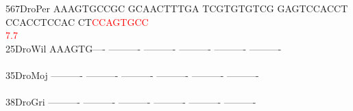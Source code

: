 \documentclass[11pt,twoside,reqno,a4paper]{article}
\begin{document}
{567\hspace*{2\charwidth}DroPer	AAAGTGCCGC	GCAACTTTGA	TCGTGTGTCG	GAGTCCACCT	CCACCTCCAC	CT\textcolor{red}{C}\textcolor{red}{C}\textcolor{red}{A}\textcolor{red}{G}\textcolor{red}{T}\textcolor{red}{G}\textcolor{red}{C}\textcolor{red}{C}	\\
\hspace*{5\charwidth}\hspace*{7\charwidth}\hspace*{1\charwidth}\hspace*{1\charwidth}\hspace*{1\charwidth}\hspace*{1\charwidth}\hspace*{1\charwidth}\hspace*{52\charwidth}\textcolor{red}{7.7}\hspace*{1\charwidth}\\
25\hspace*{3\charwidth}DroWil	AAAGTG----	----------	----------	----------	----------	----------	\\
\hspace*{5\charwidth}\hspace*{7\charwidth}\hspace*{1\charwidth}\hspace*{1\charwidth}\hspace*{1\charwidth}\hspace*{1\charwidth}\hspace*{1\charwidth}\hspace*{1\charwidth}\\
35\hspace*{3\charwidth}DroMoj	----------	----------	----------	----------	----------	----------	\\
\hspace*{5\charwidth}\hspace*{7\charwidth}\hspace*{1\charwidth}\hspace*{1\charwidth}\hspace*{1\charwidth}\hspace*{1\charwidth}\hspace*{1\charwidth}\hspace*{1\charwidth}\\
38\hspace*{3\charwidth}DroGri	----------	----------	----------	----------	----------	----------	\\
\hspace*{5\charwidth}\hspace*{7\charwidth}\hspace*{1\charwidth}\hspace*{1\charwidth}\hspace*{1\charwidth}\hspace*{1\charwidth}\hspace*{1\charwidth}\hspace*{1\charwidth}\\
}
\end{document}
